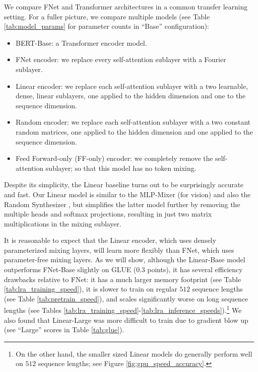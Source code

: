 We compare FNet and Transformer architectures in a common transfer learning setting. For a fuller picture, we compare multiple models (see Table \ref{tab:model_params} for parameter counts in ``Base'' configuration): 
\begin{itemize}
    \item BERT-Base: a Transformer encoder model.
    \item FNet encoder: we replace every self-attention sublayer with a Fourier sublayer.
    \item Linear encoder: we replace each self-attention sublayer with a two learnable, dense, linear sublayers, one applied to the hidden dimension and one to the sequence dimension.
    \item Random encoder: we replace each self-attention sublayer with a two constant random matrices, one applied to the hidden dimension and one applied to the sequence dimension.
    \item Feed Forward-only (FF-only) encoder: we completely remove the self-attention sublayer; so that this model has no token mixing.
\end{itemize}


Despite its simplicity, the Linear baseline turns out to be surprisingly accurate and fast. Our Linear model is similar to the MLP-Mixer \citep{tolstikhin2021mlp} (for vision) and also the Random Synthesizer \citep{tay2020synthesizer}, but simplifies the latter model further by removing the multiple heads and softmax projections, resulting in just two matrix multiplications in the mixing sublayer. 

It is reasonable to expect that the Linear encoder, which uses densely parameterized mixing layers, will learn more flexibly than FNet, which uses parameter-free mixing layers. As we will show, although the Linear-Base model outperforms FNet-Base slightly on GLUE ($0.3$ points), it has several efficiency drawbacks relative to FNet: it has a much larger memory footprint (see Table \ref{tab:lra_training_speed}), it is slower to train on regular $512$ sequence lengths (see Table \ref{tab:pretrain_speed}), and scales significantly worse on long sequence lengths (see Tables \ref{tab:lra_training_speed}-\ref{tab:lra_inference_speeds}).\footnote{On the other hand, the smaller sized Linear models do generally perform well on $512$ sequence lengths; see Figure \ref{fig:gpu_speed_accuracy}.} We also found that Linear-Large was more difficult to train due to gradient blow up (see ``Large'' scores in Table \ref{tab:glue}).

